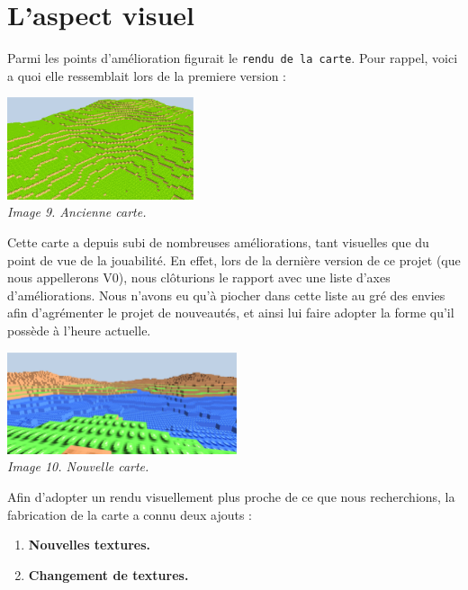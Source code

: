\section{L'aspect visuel}

Parmi les points d'amélioration figurait le \texttt{rendu de la carte}. Pour rappel, voici a quoi elle ressemblait lors de la premiere version :

\begin{center}
	\null\vspace{0.25cm}
	\includegraphics[height=3cm]{images/OurMinecraftWorld.eps}\\
	\textit{Image 9. Ancienne carte.}\\
\end{center}

Cette carte a depuis subi de nombreuses améliorations, tant visuelles que du point de vue de la jouabilité. En effet, lors de la dernière version de ce projet (que nous appellerons V0), nous clôturions le rapport avec une liste d'axes d'améliorations. Nous n'avons eu qu'à piocher dans cette liste au gré des envies afin d'agrémenter le projet de nouveautés, et ainsi lui faire adopter la forme qu'il possède à l'heure actuelle.

\begin{center}
	\null\vspace{0.25cm}
	\includegraphics[height=3cm]{images/newworld4.eps}\\
	\textit{Image 10. Nouvelle carte.}\\
\end{center}

Afin d'adopter un rendu visuellement plus proche de ce que nous recherchions, la fabrication de la carte a connu deux ajouts :
\begin{enumerate}
	\item \textbf{Nouvelles textures.}
	\item \textbf{Changement de textures.}
\end{enumerate}

